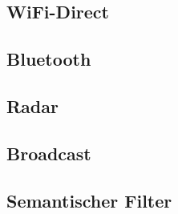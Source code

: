 \subsection{WiFi-Direct}


\subsection{Bluetooth}


\subsection{Radar}


\subsection{Broadcast}


\subsection{Semantischer Filter}
